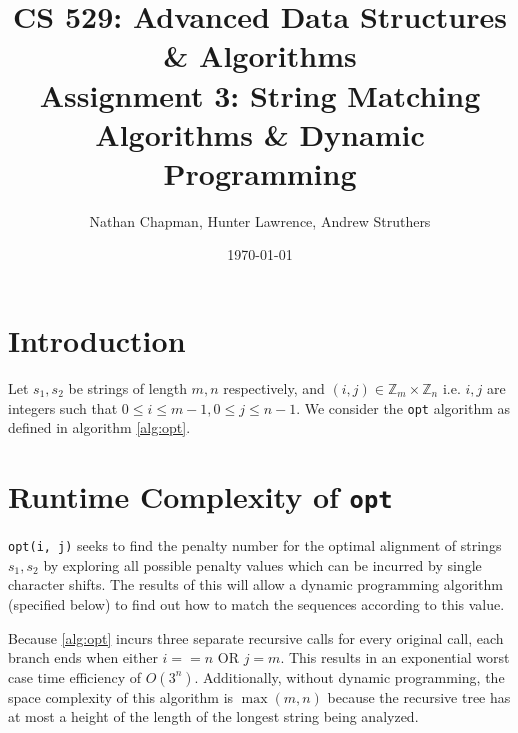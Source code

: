 \documentclass{article}
\title{\vspace*{-0.625in}CS 529: Advanced Data Structures \& Algorithms \\ Assignment 3: String Matching Algorithms \& Dynamic Programming}
\author{Nathan Chapman, Hunter Lawrence, Andrew Struthers}
\date{\today}
\renewcommand{\_}{\ifincsname_\else\legacyunderscore\fi}
\newcommand{\integer}{\textbf{int} }
\begin{document}
    \maketitle

    \section*{Introduction}

        Let $s_1, s_2$ be strings of length $m, n$ respectively, and $(i, j) \in \mathbb{Z}_m \times \mathbb{Z}_n$ i.e. $i, j$ are integers such that $0 \leq i \leq m - 1, 0 \leq j \leq n - 1$.  We consider the \texttt{opt} algorithm as defined in algorithm \ref{alg:opt}.

        \begin{function}
            \DontPrintSemicolon
            \caption{opt(\integer $i$, \integer $j$)}
            \label{alg:opt}
            
        \end{function}

    \section*{Runtime Complexity of \texttt{opt}}

        \texttt{opt(i, j)} seeks to find the penalty number for the optimal alignment of strings $s_1, s_2$ by exploring all possible penalty values which can be incurred by single character shifts. The results of this will allow a dynamic programming algorithm (specified below) to find out how to match the sequences according to this value.

        Because \ref{alg:opt} incurs three separate recursive calls for every original call, each branch ends when either $i == n$ OR $j = m$. This results in an exponential worst case time efficiency of $O(3^n)$. Additionally, without dynamic programming, the space complexity of this algorithm is $\max(m, n)$ because the recursive tree has at most a height of the length of the longest string being analyzed.
\end{document}
